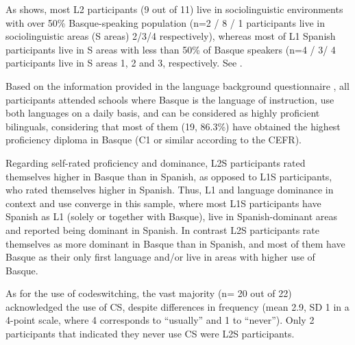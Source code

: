 \documentclass[output=paper]{langscibook}
\begin{document}
As  shows, most L2 participants (9 out of 11) live in sociolinguistic environments with over 50\% Basque-speaking population (n=2 / 8 / 1 participants live in sociolinguistic areas (S areas) 2/3/4 respectively), whereas most of L1 Spanish participants live in S areas with less than 50\% of Basque speakers (n=4 / 3/ 4 participants live in S areas 1, 2 and 3, respectively. See \citet{SoziolinguistikaKlusterra2014}.

Based on the information provided in the language background questionnaire \citep{Munarriz-IbarrolaEtAl2022}, all participants attended schools where Basque is the language of instruction, use both languages on a daily basis, and can be considered as highly proficient bilinguals, considering that most of them (19, 86.3\%) have obtained the highest proficiency diploma in Basque (C1 or similar according to the CEFR).

Regarding self-rated proficiency and dominance, L2S participants rated themselves higher in Basque than in Spanish, as opposed to L1S participants, who rated themselves higher in Spanish. Thus, L1 and language dominance in context and use converge in this sample, where most L1S participants have Spanish as L1 (solely or together with Basque), live in Spanish-dominant areas and reported being dominant in Spanish. In contrast L2S participants rate themselves as more dominant in Basque than in Spanish, and most of them have Basque as their only first language and/or live in areas with higher use of Basque.

As for the use of codeswitching, the vast majority (n= 20 out of 22) acknowledged the use of CS, despite differences in frequency (mean 2.9, SD 1 in a 4-point scale, where 4 corresponds to “usually” and 1 to “never”). Only 2 participants that indicated they never use CS were L2S participants.
\end{document}
